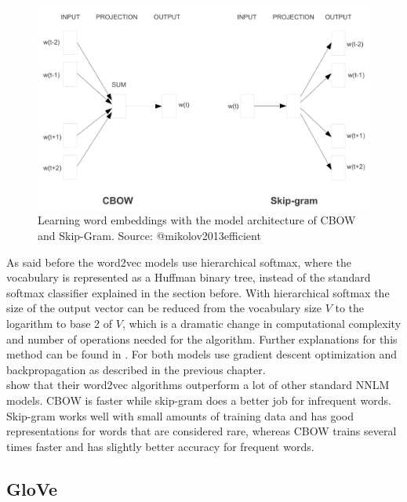 \documentclass[]{krantz}
\begin{document}
\begin{figure}
\includegraphics[width=\textwidth]{figures/01-01-foundations-applications-of-modern-NLP/01-01_word2vec} \caption{Learning word embeddings with the model architecture of CBOW and Skip-Gram.  Source: @mikolov2013efficient}\label{fig:word2vec}
\end{figure}

As said before the word2vec models use hierarchical softmax, where the vocabulary is represented as a Huffman binary tree, instead of the standard softmax classifier explained in the section before. With hierarchical softmax the size of the output vector can be reduced from the vocabulary size \(V\) to the logarithm to base 2 of \(V\), which is a dramatic change in computational complexity and number of operations needed for the algorithm. Further explanations for this method can be found in \citet{morin2005hierarchical}. For both models \citet{mikolov2013efficient} use gradient descent optimization and backpropagation as described in the previous chapter.\\
\citet{mikolov2013efficient} show that their word2vec algorithms outperform a lot of other standard NNLM models. CBOW is faster while skip-gram does a better job for infrequent words. Skip-gram works well with small amounts of training data and has good representations for words that are considered rare, whereas CBOW trains several times faster and has slightly better accuracy for frequent words.

\hypertarget{glove}{%
\subsection{GloVe}\label{glove}}
\end{document}
